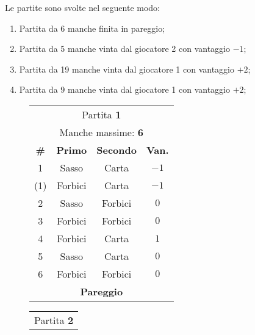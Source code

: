 \documentclass[a4paper]{article}
\begin{document}
\vspace{1em}
\noindent Le partite sono svolte nel seguente modo:
\begin{enumerate}
	\item Partita da 6 manche finita in pareggio;
	\item Partita da 5 manche vinta dal giocatore 2 con vantaggio \( -1 \);
	\item Partita da 19 manche vinta dal giocatore 1 con vantaggio \( +2 \);
	\item Partita da 9 manche vinta dal giocatore 1 con vantaggio \( +2 \);
\end{enumerate}
\begin{figure}[H]
  \centering

	\begin{minipage}{\linewidth}
  \centering
		\begin{minipage}{0.45\linewidth}
  \centering
        \begin{tabular}{|c|c|c|c|}
          \hline
          \multicolumn{4}{|c|}{Partita \textbf{1}} \\
          \multicolumn{4}{|c|}{\footnotesize Manche massime: \textbf{6}} \\
          \hline
          \footnotesize \textbf{\#} & \footnotesize \textbf{Primo} & \footnotesize \textbf{Secondo} & \footnotesize \textbf{Van.} \\
          \hline
          1 & Sasso & Carta & \( -1 \)  \\
          (1) & Forbici & Carta & \( -1 \)  \\
          2 & Sasso & Forbici & \( 0 \)  \\
          3 & Forbici & Forbici & \( 0 \)  \\
          4 & Forbici & Carta & \( 1 \)  \\
          5 & Sasso & Carta & \( 0 \)  \\
          6 & Forbici & Forbici & \( 0 \)  \\
          \hline
          \multicolumn{4}{|c|}{\footnotesize \textbf{Pareggio}} \\
          \hline
        \end{tabular}
		\end{minipage}
		\hspace{0.05\linewidth}
		\begin{minipage}{0.45\linewidth}
  \centering
        \begin{tabular}{|c|c|c|c|}
          \hline
          \multicolumn{4}{|c|}{Partita \textbf{2}} \\

\end{tabular}
\end{minipage}
\end{minipage}
\end{figure}
\end{document}

